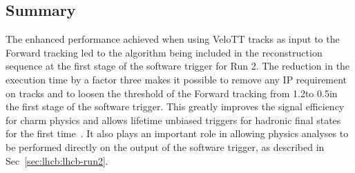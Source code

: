 \subsection{Summary}
\label{sec:up-track-run2:summary}

The enhanced performance achieved when using VeloTT tracks as input to the Forward tracking led to the algorithm being included in the reconstruction sequence at the first stage of the software trigger for Run 2. The reduction in the execution time by a factor three makes it possible to remove any IP requirement on \velo tracks and to loosen the \pt threshold of the Forward tracking from 1.2\gevc to 0.5\gevc in the first stage of the software trigger. This greatly improves the signal efficiency for charm physics and allows lifetime unbiased triggers for hadronic final states for the first time~\cite{hlt-run2}. It also plays an important role in allowing physics analyses to be performed directly on the output of the software trigger, as described in Sec~\ref{sec:lhcb:lhcb-run2}.